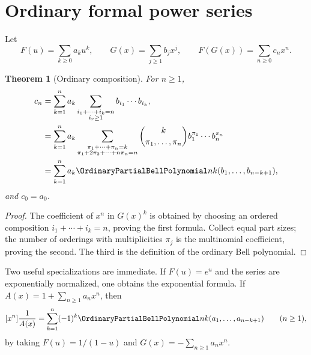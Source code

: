\documentclass[11pt,a4paper,oneside,openany]{book}
\newtheorem{theorem}{Theorem}[chapter]
\theoremstyle{definition}
\theoremstyle{remark}
\begin{document}
\section{Ordinary formal power series}
Let
\[
 F(u)=\sum_{k\ge0}a_ku^k,
 \qquad
 G(x)=\sum_{j\ge1}b_jx^j,
 \qquad
 F(G(x))=\sum_{n\ge0}c_nx^n.
\]
\begin{theorem}[Ordinary composition]\label{thm:ordinary-composition}
For $n\ge1$,
\begin{align}
 c_n&=\sum_{k=1}^{n}a_k
 \sum_{\substack{i_1+\cdots+i_k=n\\i_r\ge1}}
 b_{i_1}\cdots b_{i_k},
 \label{eq:ordinary-composition-compositions}\\
 &=\sum_{k=1}^{n}a_k
 \sum_{\substack{\pi_1+\cdots+\pi_n=k\\
                   \pi_1+2\pi_2+\cdots+n\pi_n=n}}
 \binom{k}{\pi_1,\ldots,\pi_n}
 b_1^{\pi_1}\cdots b_n^{\pi_n}
 \label{eq:ordinary-composition-multiplicities}\\
 &=\sum_{k=1}^{n}a_k\OrdinaryPartialBellPolynomial nk(b_1,\ldots,b_{n-k+1}),
 \label{eq:ordinary-composition-bell}
\end{align}
and $c_0=a_0$.
\end{theorem}
\begin{proof}
The coefficient of $x^n$ in $G(x)^k$ is obtained by choosing an ordered
composition $i_1+\cdots+i_k=n$, proving the first formula.  Collect equal part
sizes; the number of orderings with multiplicities $\pi_j$ is the multinomial
coefficient, proving the second.  The third is the definition of the ordinary
Bell polynomial.
\end{proof}

Two useful specializations are immediate.  If $F(u)=e^u$ and the series are
exponentially normalized, one obtains the exponential formula.  If
$A(x)=1+\sum_{n\ge1}a_nx^n$, then
\begin{equation}\label{eq:reciprocal-ordinary-bell}
 [x^n]\frac1{A(x)}
 =\sum_{k=1}^{n}(-1)^k\OrdinaryPartialBellPolynomial nk(a_1,\ldots,a_{n-k+1})
 \qquad(n\ge1),
\end{equation}
by taking $F(u)=1/(1-u)$ and $G(x)=-\sum_{n\ge1}a_nx^n$.
\end{document}

